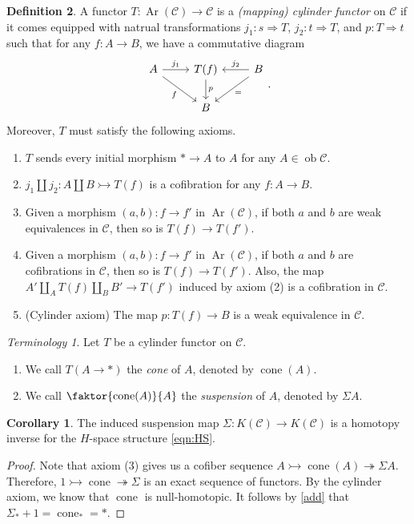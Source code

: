 \documentclass[10pt,letterpaper,cm]{nupset}
\theoremstyle{definition}
\newtheorem{definition}{Definition}[section]
\theoremstyle{theorem}
\newtheorem{corollary}[definition]{Corollary}
\theoremstyle{remark}
\newtheorem*{term}{Terminology}
\newcommand{\1}{\mathbf{1}}
\renewcommand{\c}{\mathscr{C}}
\newcommand{\0}{\vec 0}
\DeclareMathOperator{\ob}{ob}
\DeclareMathOperator{\Ar}{Ar}
\DeclareMathOperator{\cone}{cone}
\begin{document}
\begin{definition}
A functor $T: \Ar(\c) \to \c$ is a \textit{(mapping) cylinder functor} on $\c$ if it comes equipped with natrual transformations $j_1 :  s \Rightarrow T$, $j_2 : t \Rightarrow T$, and $p: T \Rightarrow t$ such that for any $f: A \to B$, we have a commutative diagram
\[
\begin{tikzcd}
A \arrow[r, "j_1"] \arrow[rd, "f"'] & T(f) \arrow[d, "p"] & B \arrow[l, "j_2"'] \arrow[ld, "="] \\
 & B & 
\end{tikzcd}
. \]
Moreover, $T$ must satisfy the following axioms.
\begin{enumerate}[label=(\arabic*)]
\item $T$ sends every initial morphism $\ast \to A$ to $A$ for any $A \in \ob \c$.
\item $j_1 \coprod j_2 : A \coprod B \rightarrowtail T(f)$ is a cofibration for any $f: A \to B$.
\item Given a morphism $(a,b) : f \to f'$ in $\Ar(\c)$, if both $a$ and $b$ are weak equivalences in $\c$, then so is $T(f) \to T(f').$
\item Given a morphism $(a,b) : f \to f'$ in $\Ar(\c)$, if both $a$ and $b$ are cofibrations in $\c$, then so is $T(f) \to T(f')$. Also, the map $A' \coprod_A T(f) \coprod_B B' \to T(f')$ induced by axiom (2) is a cofibration in $\c$.
\item {(Cylinder axiom)} The map $p: T(f) \to B$ is a weak equivalence in $\c$.
\end{enumerate}

\smallskip

\begin{term} Let $T$ be a cylinder functor on $\c$.
\begin{enumerate}
\item We call $T(A \to \ast)$ the \textit{cone} of $A$, denoted by $\cone(A)$.
\item We call $\faktor{\cone(A)}{A}$ the \textit{suspension} of $A$, denoted by $\Sigma A$. 
\end{enumerate}
\end{term}

\begin{corollary}
The induced suspension map $\Sigma : K(\c) \to K(\c)$ is a homotopy inverse for the $H$-space structure \eqref{eqn:HS}.
\end{corollary}
\begin{proof}
Note that axiom (3) gives us a cofiber sequence $A \rightarrowtail \cone(A) \twoheadrightarrow \Sigma A$. Therefore, $1 \rightarrowtail \cone \twoheadrightarrow \Sigma$ is an exact sequence of functors. By the cylinder axiom, we know that $\cone$ is null-homotopic. It follows by \cref{add} that $\Sigma_{\ast} + 1 =  \cone_{\ast} = \ast$.
\end{proof}
\end{definition}
\end{document}
